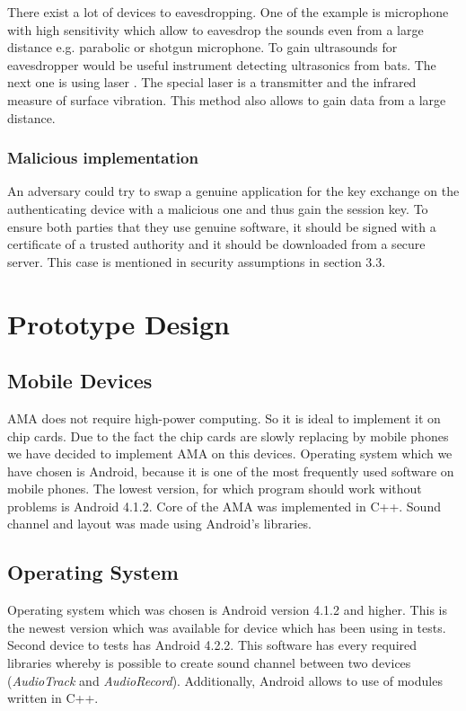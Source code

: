 \documentclass[11pt,titlepage]{article}
\theoremstyle{plain}
\begin{document}
There exist a lot of devices to eavesdropping. One of the example is microphone with high sensitivity which allow to eavesdrop the sounds even from a large distance e.g. parabolic or shotgun  microphone. To gain ultrasounds for eavesdropper would be useful instrument detecting ultrasonics from bats. The next one is using laser \cite{laser_mic}. The special laser is a transmitter and the infrared measure of surface vibration. This method also allows to gain data from a large distance. 

\subsubsection{Malicious implementation}
An adversary could try to swap a genuine application for the key exchange on the authenticating device with a malicious one and thus gain the session key. To ensure both parties that they use genuine software, it should be signed with a certificate of a trusted authority and it should be downloaded from a secure server. This case is mentioned in security assumptions in section 3.3.



\section{Prototype Design}
\subsection{Mobile Devices}

AMA does not require high-power computing. So it is ideal to implement it on chip cards. Due to the fact the chip cards are slowly replacing by mobile phones we have decided to implement AMA on this devices. Operating system which we have chosen is Android, because it is one of the most frequently used software on mobile phones. The lowest version, for which program should work without problems is Android 4.1.2. Core of the AMA was implemented in C++. Sound channel and layout was made using Android's libraries. 

\subsection{Operating System}

Operating system which was chosen is Android version 4.1.2 and higher. This is the newest version which was available for device which has been using in tests. Second device to tests has Android 4.2.2. This software has every required libraries whereby is possible to create sound channel between two devices (\textit{AudioTrack} and \textit{AudioRecord}). Additionally, Android allows to use of modules written in C++. 
\end{document}
